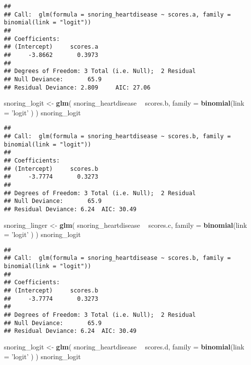 \documentclass[12pt,hyperref,]{ctexart}
\newenvironment{Shaded}{\begin{snugshade}}{\end{snugshade}}
\newcommand{\DataTypeTok}[1]{\textcolor[rgb]{0.13,0.29,0.53}{#1}}
\newcommand{\KeywordTok}[1]{\textcolor[rgb]{0.13,0.29,0.53}{\textbf{#1}}}
\newcommand{\NormalTok}[1]{#1}
\newcommand{\OperatorTok}[1]{\textcolor[rgb]{0.81,0.36,0.00}{\textbf{#1}}}
\newcommand{\StringTok}[1]{\textcolor[rgb]{0.31,0.60,0.02}{#1}}
\begin{document}
\begin{verbatim}
## 
## Call:  glm(formula = snoring_heartdisease ~ scores.a, family = binomial(link = "logit"))
## 
## Coefficients:
## (Intercept)     scores.a  
##     -3.8662       0.3973  
## 
## Degrees of Freedom: 3 Total (i.e. Null);  2 Residual
## Null Deviance:       65.9 
## Residual Deviance: 2.809     AIC: 27.06
\end{verbatim}

\begin{Shaded}
\begin{Highlighting}[]
\NormalTok{snoring_logit <-}\StringTok{ }\KeywordTok{glm}\NormalTok{(}
\NormalTok{  snoring_heartdisease }\OperatorTok{~}\StringTok{ }\NormalTok{scores.b, }\DataTypeTok{family =} \KeywordTok{binomial}\NormalTok{(}\DataTypeTok{link =} \StringTok{'logit'}\NormalTok{ )}
\NormalTok{)}
\NormalTok{snoring_logit}
\end{Highlighting}
\end{Shaded}

\begin{verbatim}
## 
## Call:  glm(formula = snoring_heartdisease ~ scores.b, family = binomial(link = "logit"))
## 
## Coefficients:
## (Intercept)     scores.b  
##     -3.7774       0.3273  
## 
## Degrees of Freedom: 3 Total (i.e. Null);  2 Residual
## Null Deviance:       65.9 
## Residual Deviance: 6.24  AIC: 30.49
\end{verbatim}

\begin{Shaded}
\begin{Highlighting}[]
\NormalTok{snoring_linger <-}\StringTok{ }\KeywordTok{glm}\NormalTok{(}
\NormalTok{  snoring_heartdisease }\OperatorTok{~}\StringTok{ }\NormalTok{scores.c, }\DataTypeTok{family =} \KeywordTok{binomial}\NormalTok{(}\DataTypeTok{link =} \StringTok{'logit'}\NormalTok{ )}
\NormalTok{)}
\NormalTok{snoring_logit}
\end{Highlighting}
\end{Shaded}

\begin{verbatim}
## 
## Call:  glm(formula = snoring_heartdisease ~ scores.b, family = binomial(link = "logit"))
## 
## Coefficients:
## (Intercept)     scores.b  
##     -3.7774       0.3273  
## 
## Degrees of Freedom: 3 Total (i.e. Null);  2 Residual
## Null Deviance:       65.9 
## Residual Deviance: 6.24  AIC: 30.49
\end{verbatim}

\begin{Shaded}
\begin{Highlighting}[]
\NormalTok{snoring_logit <-}\StringTok{ }\KeywordTok{glm}\NormalTok{(}
\NormalTok{  snoring_heartdisease }\OperatorTok{~}\StringTok{ }\NormalTok{scores.d, }\DataTypeTok{family =} \KeywordTok{binomial}\NormalTok{(}\DataTypeTok{link =} \StringTok{'logit'}\NormalTok{ )}
\NormalTok{)}
\NormalTok{snoring_logit}
\end{Highlighting}
\end{Shaded}
\end{document}
